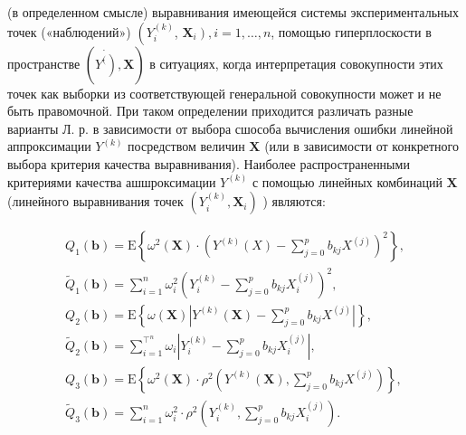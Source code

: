 \documentclass[10pt]{article}
\begin{document}
(в определенном смысле) выравнивания имеющейся системы экспериментальных точек («наблюдений») $\left(Y_{i}^{(k)}\right.$, $\left.\boldsymbol{X}_{i}\right), i=1, \ldots, n$, помощью гиперплоскости в пространстве $\left(\dot{\left.Y^{(}\right)}, \boldsymbol{X}\right)$ в ситуациях, когда интерпретация совокупности этих точек как выборки из соответствующей генеральной совокупности может и не быть правомочной. При таком определении приходится различать разные варианты Л. р. в зависимости от выбора сшособа вычисления ошибки линейной аппроксимации $Y^{(k)}$ посредством величин $\boldsymbol{X}$ (или в зависимости от конкретного выбора критерия качества выравнивания). Наиболее распространенными критериями качества ашшроксимации $Y^{(k)}$ с помощью линейных комбинаций $\boldsymbol{X}$ (линейного выравнивания точек $\left(Y_{i}^{(k)}, \boldsymbol{X}_{i}\right)$ ) являются:



\[

\begin{gathered}

Q_{1}(\boldsymbol{b})=\mathrm{E}\left\{\omega^{2}(\boldsymbol{X}) \cdot\left(Y^{(k)}(X)-\sum_{j=0}^{p} b_{k j} X^{(j)}\right)^{2}\right\}, \\

\tilde{Q}_{1}(\boldsymbol{b})=\sum_{i=1}^{n} \omega_{i}^{2}\left(Y_{i}^{(k)}-\sum_{j=0}^{p} b_{k j} X_{i}^{(j)}\right)^{2}, \\

Q_{2}(\boldsymbol{b})=\mathrm{E}\left\{\omega(\boldsymbol{X})\left|Y^{(k)}(\boldsymbol{X})-\sum_{j=0}^{p} b_{k j} X^{(j)}\right|\right\}, \\

\tilde{Q}_{2}(\boldsymbol{b})=\sum_{i=1}^{\top^{n}} \omega_{i}\left|Y_{i}^{(k)}-\sum_{j=0}^{p} b_{k j} X_{i}^{(j)}\right|, \\

Q_{3}(\boldsymbol{b})=\mathrm{E}\left\{\omega^{2}(\boldsymbol{X}) \cdot \rho^{2}\left(Y^{(k)}(\boldsymbol{X}), \sum_{j=0}^{p} b_{k j} X^{(j)}\right)\right\}, \\

\tilde{Q}_{3}(\boldsymbol{b})=\sum_{i=1}^{n} \omega_{i}^{2} \cdot \rho^{2}\left(Y_{i}^{(k)}, \sum_{j=0}^{p} b_{k j} X_{i}^{(j)}\right) .

\end{gathered}

\]
\end{document}

